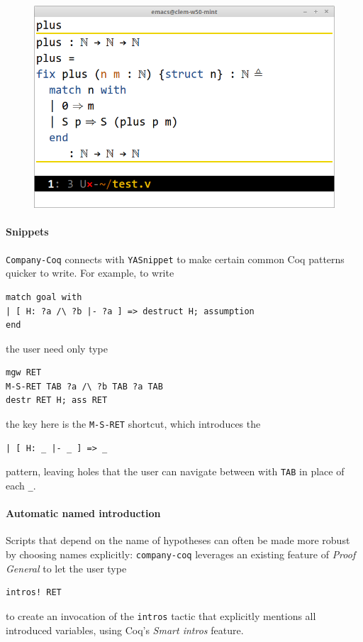 \documentclass[preprint]{sigplanconf}
\newcommand{\proofg}{\emph{Proof General}\xspace}
\begin{document}
\begin{figure}[H]
  \centering
  \includegraphics[width=\linewidth]{inline-docs-xxl.png}
\end{figure}

\paragraph{Snippets} \texttt{Company-Coq} connects with \texttt{YASnippet} to make certain common Coq patterns quicker to write. For example, to write
\begin{verbatim}
match goal with
| [ H: ?a /\ ?b |- ?a ] => destruct H; assumption
end
\end{verbatim}
the user need only type
\begin{verbatim}
mgw RET
M-S-RET TAB ?a /\ ?b TAB ?a TAB
destr RET H; ass RET
\end{verbatim}
the key here is the \texttt{M-S-RET} shortcut, which introduces the
\begin{verbatim}
| [ H: _ |- _ ] => _
\end{verbatim}
pattern, leaving holes that the user can navigate between with \texttt{TAB} in place of each \texttt{\_}.

\paragraph{Automatic named introduction} Scripts that depend on the name of hypotheses can often be made more robust by choosing names explicitly: \texttt{company-coq} leverages an existing feature of \proofg to let the user type
\begin{verbatim}
intros! RET
\end{verbatim}
to create an invocation of the \texttt{intros} tactic that explicitly mentions all introduced variables, using Coq's \emph{Smart intros} feature.
\end{document}
